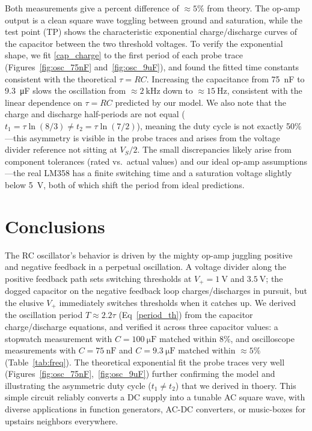 \documentclass[11pt]{article}
\begin{document}
Both measurements give a percent difference of $\approx 5\%$ from theory. The op-amp output is a clean square wave toggling between ground and saturation, while the test point (TP) shows the characteristic exponential charge/discharge curves of the capacitor between the two threshold voltages. To verify the exponential shape, we fit \eqref{cap_charge} to the first period of each probe trace  (Figures~\ref{fig:osc_75nF} and~\ref{fig:osc_9uF}), and found the fitted time constants consistent with the theoretical $\tau=RC$. Increasing the capacitance from \qty{75}{\nano\farad} to \qty{9.3}{\micro\farad} slows the oscillation from $\approx\qty{2}{\kilo\hertz}$ down to $\approx\qty{15}{\hertz}$, consistent with the linear dependence on $\tau=RC$ predicted by our model. We also note that the charge and discharge half-periods are not equal ($t_1=\tau\ln(8/3) \neq t_2=\tau\ln(7/2)$), meaning the duty cycle is not exactly 50\%---this asymmetry is visible in the probe traces and arises from the voltage divider reference not sitting at $V_S/2$. The small discrepancies likely arise from component tolerances (rated vs.\ actual values) and our ideal op-amp assumptions---the real LM358 has a finite switching time and a saturation voltage slightly below \qty{5}{\volt}, both of which shift the period from ideal predictions.


\section{Conclusions}



The RC oscillator's behavior is driven by the mighty op-amp juggling positive and negative feedback in a perpetual oscillation. A voltage divider along the positive feedback path sets switching thresholds at $V_+=\qty{1}{\volt}$ and $\qty{3.5}{\volt}$; the dogged capacitor on the negative feedback loop charges/discharges in pursuit, but the elusive $V_+$ immediately switches thresholds when it catches up. We derived the oscillation period $T\approx 2.2\tau$ (Eq~\eqref{period_th}) from the capacitor charge/discharge equations, and verified it across three capacitor values: a stopwatch measurement with $C=\qty{100}{\micro\farad}$ matched within 8\%, and oscilloscope measurements with $C=\qty{75}{\nano\farad}$ and $C=\qty{9.3}{\micro\farad}$ matched within $\approx 5\%$ (Table~\ref{tab:freq}). The theoretical exponential fit the probe traces very well (Figures~\ref{fig:osc_75nF},~\ref{fig:osc_9uF}) further confirming the model and illustrating the asymmetric duty cycle ($t_1 \neq t_2$) that we derived in thoery. This simple circuit reliably converts a DC supply into a tunable AC square wave, with diverse applications in function generators, AC-DC converters, or music-boxes for upstairs neighbors everywhere.
\end{document}
